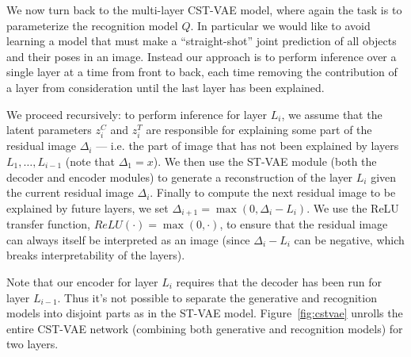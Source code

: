 
We now turn back to the multi-layer CST-VAE model, where again the task is to parameterize the recognition model $Q$. 
In particular we would like to 
avoid learning a model that must make a ``straight-shot'' joint prediction of all objects and their poses in an image.
Instead our approach is to perform inference over a single layer at a time from front to back, each time removing the contribution of a layer
from consideration until the last layer has been explained.


We proceed recursively: to perform inference for  layer $L_i$, we assume that the latent parameters $z^C_i$ and $z^T_i$ are responsible for explaining
some part of the residual image $\Delta_i$ --- i.e. the part of image that has not been explained by layers $L_1, \dots, L_{i-1}$ (note that $\Delta_1=x$).
We then use the ST-VAE module (both the decoder and encoder modules) 
to generate a reconstruction of the layer $L_i$ given the current residual image $\Delta_i$.  Finally to compute the next residual image to be explained by future layers, we set
$\Delta_{i+1} = \max (0, \Delta_i - L_i)$.  
We use 
the ReLU transfer function, $ReLU(\cdot)=\max(0, \cdot)$,  to ensure
that the residual image can always itself be interpreted as an image
(since 
$\Delta_i-L_i$ can be negative, which breaks interpretability of the
layers).

Note that our encoder for layer $L_i$ requires that the decoder has been run for layer $L_{i-1}$.  Thus it's not possible to separate the generative
and recognition models into disjoint parts as in the ST-VAE model.  Figure~\ref{fig:cstvae} unrolls the entire CST-VAE network (combining
both generative and recognition models) for two layers.
\vspace{-3mm}














